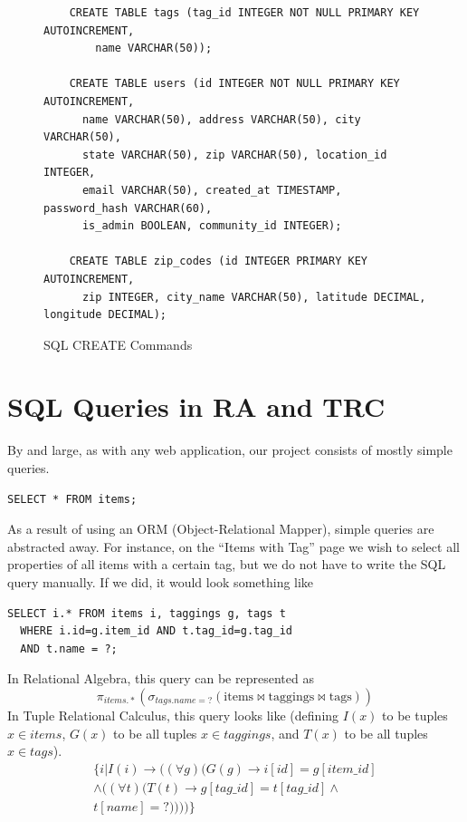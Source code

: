 \documentclass{acm_proc_article-sp}
\begin{document}
\begin{figure}[p]
\begin{lstlisting}
    CREATE TABLE tags (tag_id INTEGER NOT NULL PRIMARY KEY AUTOINCREMENT, 
        name VARCHAR(50));

    CREATE TABLE users (id INTEGER NOT NULL PRIMARY KEY AUTOINCREMENT, 
      name VARCHAR(50), address VARCHAR(50), city VARCHAR(50), 
      state VARCHAR(50), zip VARCHAR(50), location_id INTEGER, 
      email VARCHAR(50), created_at TIMESTAMP, password_hash VARCHAR(60), 
      is_admin BOOLEAN, community_id INTEGER);

    CREATE TABLE zip_codes (id INTEGER PRIMARY KEY AUTOINCREMENT, 
      zip INTEGER, city_name VARCHAR(50), latitude DECIMAL, longitude DECIMAL);
    \end{lstlisting}
    \caption{SQL CREATE Commands}
    \label{fig:SQLCreateCommands}
\end{figure}

\section{SQL Queries in RA and TRC}
By and large, as with any web application, our project consists of mostly simple queries. 
\begin{centering}
\begin{lstlisting}
SELECT * FROM items;
\end{lstlisting}
\end{centering}

As a result of using an ORM (Object-Relational Mapper), simple queries are abstracted away. 
For instance, on the ``Items with Tag'' page we wish to select all properties of
all items with a certain tag, but we do not have to write the SQL query manually. If we did, it would look something
like
\lstset{language=SQL}
\begin{lstlisting}
SELECT i.* FROM items i, taggings g, tags t 
  WHERE i.id=g.item_id AND t.tag_id=g.tag_id 
  AND t.name = ?;
\end{lstlisting}

In Relational Algebra, this query can be represented as
\[ \pi_{items.*}(\sigma_{tags.name=?}(\text{items}\bowtie\text{taggings}\bowtie\text{tags})) \]
In Tuple Relational Calculus, this query looks like (defining $I(x)$ to be tuples $x \in \textit{items}$,
$G(x)$ to be all tuples $x \in \textit{taggings}$, and $T(x)$ to be all tuples $x \in \textit{tags}$).
\begin{displaymath}
\begin{split} 
\{i | I(i) \to ((\forall g)(G(g) \to i[id] = g[item\_id] \\
\land ((\forall t)(T(t) \to g[tag\_id] = t[tag\_id] \land \\
t[name] = ?))))\}
\end{split}
\end{displaymath}
\end{document}
